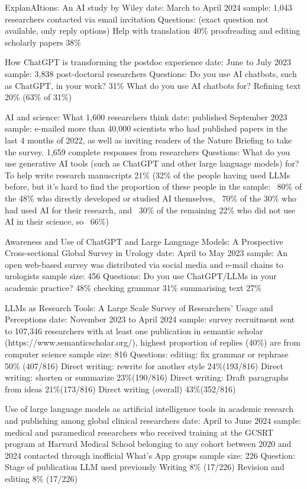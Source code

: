 \cite{Wiley2025} ExplanAItions: An AI study by Wiley
date: March to April 2024
sample: 1,043 researchers contacted via email invitation
Questions:
(exact question not available, only reply options)
Help with translation 40\%
proofreading and editing scholarly papers 38\% 

\cite{Nordling2023} How ChatGPT is transforming the postdoc experience
date: June to July 2023
sample: 3,838 post-doctoral researchers
Questions: 
Do you use AI chatbots, such as ChatGPT, in your work? 31\%
What do you use AI chatbots for? Refining text 20\% (63\% of 31\%)

\cite{VanNoorden2023} AI and science: What 1,600 researchers think
date: published September 2023
sample: e-mailed more than 40,000 scientists who had published papers in the last 4 months of 2022, as well as inviting readers of the Nature Briefing to take the survey. 1,659 complete responses from researchers
Questions:
What do you use generative AI tools (such as ChatGPT and other large language models) for?
To help write research manuscripts 21\% (32\% of the people having used LLMs before, but it's hard to find the proportion of these people in the sample: ~80\% of the 48\% who directly developed or studied AI themselves, ~70\% of the 30\% who had used AI for their research, and ~30\% of the remaining 22\% who did not use AI in their science, so ~66\%)

\cite{Eppler2024} Awareness and Use of ChatGPT and Large Language Models: A
Prospective Cross-sectional Global Survey in Urology
date: April to May 2023
sample: An open web-based survey was distributed via social media and e-mail chains to urologists
sample size: 456
Questions:
Do you use ChatGPT/LLMs in your academic practice? 48\%
checking grammar 31\%
summarising text 27\%

\cite{Liao2024} LLMs as Research Tools: A Large Scale Survey of Researchers' Usage and Perceptions
date: November 2023 to April 2024
sample: survey recruitment sent to 107,346 researchers with at least one publication in semantic scholar (https://www.semanticscholar.org/), highest proportion of replies (40\%) are from computer science
sample size: 816
Questions:
editing: fix grammar or rephrase 50\% (407/816)
Direct writing: rewrite for another style 24\%(193/816)
Direct writing: shorten or summarize 23\%(190/816)
Direct writing: Draft paragraphs from ideas 21\%(173/816)
Direct writing (overall) 43\%(352/816)

\cite{Mishra2024} Use of large language models as artificial intelligence tools in academic research and publishing among global clinical researchers
date: April to June 2024
sample: medical and paramedical researchers who received training at the GCSRT program at Harvard Medical School belonging to any cohort between 2020 and 2024 contacted through inofficial What's App groups
sample size: 226
Question: Stage of publication LLM used previously
Writing 8\% (17/226)
Revision and editing 8\% (17/226)

